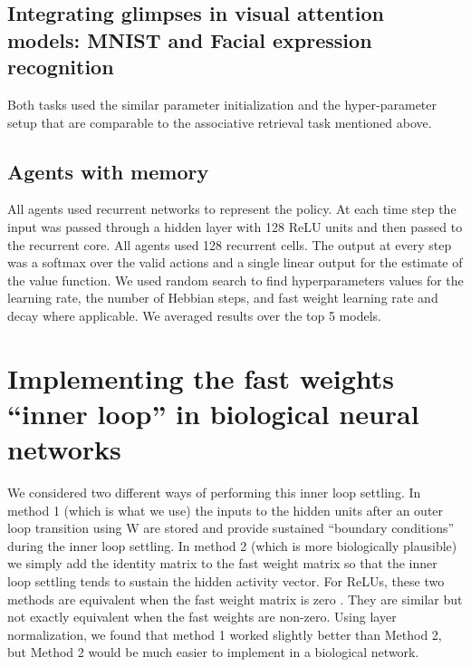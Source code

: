 \documentclass{article}
\begin{document}
\subsection{Integrating glimpses in visual attention models: MNIST and Facial expression recognition}

Both tasks used the similar parameter initialization and the hyper-parameter setup that are comparable to the associative retrieval task mentioned above.


\subsection{Agents with memory}

All agents used recurrent networks to represent the policy. At each time step
the input was passed through a hidden layer with 128 ReLU units and then passed
to the recurrent core. All agents used 128 recurrent cells. The output at every
step was a softmax over the valid actions and a single linear output for the
estimate of the value function. We used random search to find hyperparameters
values for the learning rate, the number of Hebbian steps, and fast weight
learning rate and decay where applicable.  We averaged results over the top 5
models.


\section{Implementing the fast weights ``inner loop'' in biological neural networks}

We considered two different ways of performing this inner loop settling. In method 1 (which is what we use) the inputs to the hidden units after an outer loop transition using W are stored and provide sustained “boundary conditions” during the inner loop settling. In method 2 (which is more biologically plausible)  we simply add the identity matrix to the fast weight matrix so that the inner loop settling tends to sustain the hidden activity vector. For ReLUs, these two methods are equivalent when the fast weight matrix is zero . They are similar but not exactly equivalent when the fast weights are non-zero. Using layer normalization, we found that method 1 worked slightly better than Method 2, but Method 2 would be much easier to implement in a biological network. 
\end{document}
